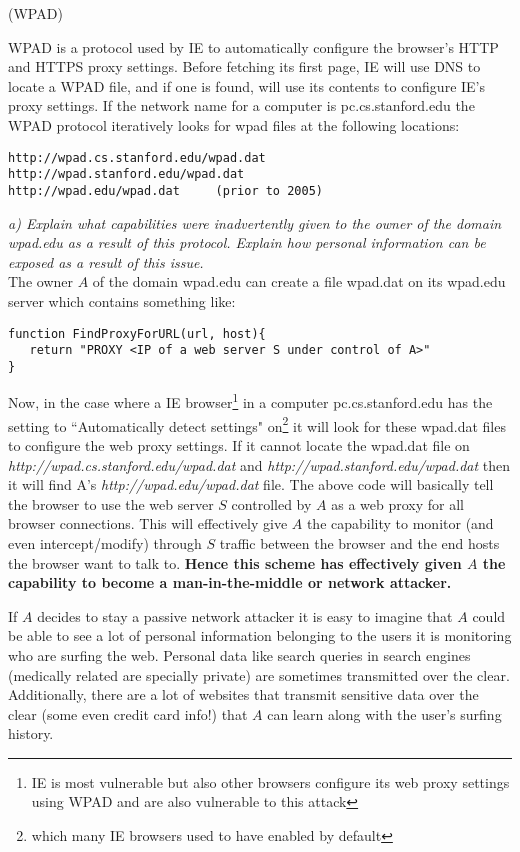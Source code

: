 \begin{prob}  (WPAD) 
\end{prob}

\noindent WPAD is a protocol used by IE to automatically configure the browser's HTTP and HTTPS proxy settings. Before fetching its first page, IE will use DNS to locate a WPAD file, and if one is found, will use its contents to configure IE's proxy settings. If the network name for a computer is pc.cs.stanford.edu the WPAD protocol iteratively looks for wpad files at the following locations:

\begin{verbatim}
http://wpad.cs.stanford.edu/wpad.dat
http://wpad.stanford.edu/wpad.dat
http://wpad.edu/wpad.dat     (prior to 2005)
\end{verbatim}

\noindent \textit{a) Explain what capabilities were inadvertently given to the owner of the domain wpad.edu as a result of this protocol. Explain how personal information can be exposed as a result of this issue.}\\

\noindent The owner $A$ of the domain wpad.edu can create a file wpad.dat on its wpad.edu server which contains something like:
\begin{verbatim}
function FindProxyForURL(url, host){
   return "PROXY <IP of a web server S under control of A>"
}
\end{verbatim}
Now, in the case where a IE browser\footnote{IE is most vulnerable but also other browsers configure its web proxy settings using WPAD and are also vulnerable to this attack} in a computer pc.cs.stanford.edu has the setting to ``Automatically detect settings" on\footnote{which many IE browsers used to have enabled by default} it will look for these wpad.dat files to configure the web proxy settings. If it cannot locate the wpad.dat file on \textit{http://wpad.cs.stanford.edu/wpad.dat} and \textit{http://wpad.stanford.edu/wpad.dat} then it will find A's \textit{http://wpad.edu/wpad.dat} file. The above code will basically tell the browser to use the web server $S$ controlled by $A$ as a web proxy for all browser connections.  This will effectively give $A$ the capability to monitor (and even intercept/modify) through $S$ traffic between the browser and the end hosts the browser want to talk to. \textbf{Hence this scheme has effectively given $A$ the capability to become a man-in-the-middle or network attacker.} 

If $A$ decides to stay a passive network attacker it is easy to imagine that $A$ could be able to see a lot of personal information belonging to the users it is monitoring who are surfing the web. Personal data like search queries in search engines (medically related are specially private) are sometimes transmitted over the clear. Additionally, there are a lot of websites that transmit sensitive data over the clear (some even credit card info!) that $A$ can learn along with the user's surfing history.

